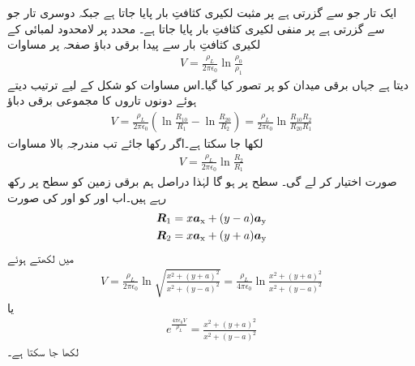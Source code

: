 ایک تار جو  سے گزرتی ہے  پر مثبت لکیری کثافتِ بار  پایا جاتا ہے جبکہ دوسری تار جو  سے گزرتی ہے  پر منفی لکیری کثافتِ بار  پایا جاتا ہے۔ محدد پر لامحدود لمبائی کے لکیری کثافتِ بار سے پیدا برقی دباؤ صفحہ  پر مساوات 
\begin{align*}
V=\frac{\rho_L}{2\pi \epsilon_0} \ln \frac{\rho_0}{\rho_1}
\end{align*}
 دیتا ہے جہاں برقی میدان کو  پر تصور کیا گیا۔اس مساوات کو شکل  کے لیے ترتیب دیتے ہوئے دونوں تاروں کا مجموعی برقی دباؤ
\begin{align*}
V=\frac{\rho_L}{2\pi \epsilon_0}\left( \ln \frac{R_{10}}{R_1}-\ln \frac{R_{20}}{R_2} \right)=\frac{\rho_L}{2\pi \epsilon_0} \ln \frac{R_{10} R_2}{R_{20}R_1}
\end{align*}
لکھا جا سکتا ہے۔اگر  رکھا جائے تب مندرجہ بالا مساوات 
\begin{align*}
V=\frac{\rho_L}{2\pi \epsilon_0} \ln \frac{R_2}{R_1}
\end{align*}
صورت اختیار کر لے گی۔ سطح  پر  ہو گا لہٰذا دراصل ہم برقی زمین کو  سطح پر رکھ رہے ہیں۔اب  اور  کو  اور  کی صورت
\begin{align*}
{\ensuremath{{\boldsymbol{R}}}}_1&=x{\boldsymbol{a}}_{\textup{x}}+(y-a){\boldsymbol{a}}_{\textup{y}}\\
{{\boldsymbol{R}}}_2&=x{\boldsymbol{a}}_{\textup{x}}+(y+a){\boldsymbol{a}}_{\textup{y}}
\end{align*}
 میں لکھتے ہوئے
\begin{align}\label{مساوات_کپیسٹر_ہم_قوہ_سطح_کارتیسی_مساوات}
V=\frac{\rho_L}{2\pi \epsilon_0} \ln \sqrt {\frac{x^2+(y+a)^2}{x^2+(y-a)^2}}=\frac{\rho_L}{4\pi \epsilon_0} \ln \frac{x^2+(y+a)^2}{x^2+(y-a)^2}
\end{align}
یا
\begin{align}
e^{\frac{4\pi\epsilon_0 V}{\rho_L}}=\frac{x^2+(y+a)^2}{x^2+(y-a)^2}
\end{align}
لکھا جا سکتا ہے۔

